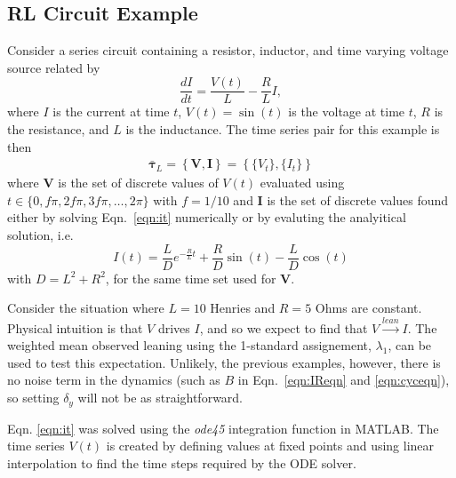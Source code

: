 \documentclass[a4paper,11pt,twocolumn]{article}
\begin{document}
\subsection{RL Circuit Example}
\label{sec:rlcirc}
Consider a series circuit containing a resistor, inductor, and time varying voltage source related by
\begin{equation}
\label{eqn:it}
\frac{dI}{dt} = \frac{V(t)}{L} - \frac{R}{L} I,
\end{equation}
where $I$ is the current at time $t$, $V(t)= \sin\left(t\right)$ is the voltage at time $t$, $R$ is the resistance, and $L$ is the inductance.  The time series pair for this example is then 
\begin{eqnarray}
\label{eqn:RLcirceqn}
\bar{\mathbf{\tau}}_L = \left\{\mathbf{V},\mathbf{I}\right\} = \left\{\{V_t\},\{I_t\}\right\}
\end{eqnarray}
where $\mathbf{V}$ is the set of discrete values of $V(t)$ evaluated using $t\in\{0,f\pi,2f\pi,3f\pi,\ldots,2\pi\}$ with $f=1/10$ and $\mathbf{I}$ is the set of discrete values found either by solving Eqn.\ \ref{eqn:it} numerically or by evaluting the analyitical solution, i.e.\
\begin{equation}
I(t) = \frac{L}{D}e^{-\frac{R}{L}t}+\frac{R}{D}\sin(t)-\frac{L}{D}\cos(t)
\end{equation}
with $D = L^2 + R^2$, for the same time set used for $\mathbf{V}$.

Consider the situation where $L=10$ Henries and $R=5$ Ohms are constant.  Physical intuition is that $V$ drives $I$, and so we expect to find that $V\xrightarrow{lean}I$.  The weighted mean observed leaning using the 1-standard assignement, $\lambda_1$, can be used to test this expectation.  Unlikely, the previous examples, however, there is no noise term in the dynamics (such as $B$ in Eqn.\ \ref{eqn:IReqn} and \ref{eqn:cyceqn}), so setting $\delta_y$ will not be as straightforward.  

Eqn. \ref{eqn:it} was solved using the {\em ode45} integration function in MATLAB.  The time series $V(t)$ is created by defining values at fixed points and using linear interpolation to find the time steps required by the ODE solver.  

 
\end{document}
